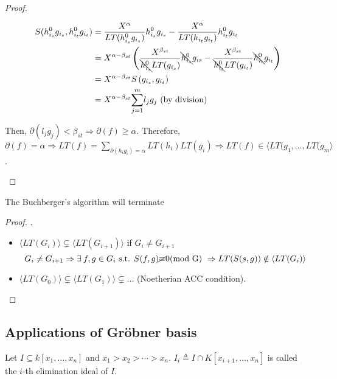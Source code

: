 \begin{theorem}
\begin{proof}
\begin{description} [leftmargin=0cm,labelindent=0cm]
\begin{equation}
\begin{split}
              S(h_{i_s}^0g_{i_s}, h_{i_t}^0g_{i_t}) &= \frac{X^\alpha}{LT(h_{i_s}^0g_{i_s})}h_{i_s}^0g_{i_s} - \frac{X^\alpha}{LT(h_{i_t}g_{i_t})}h_{i_t}^0g_{i_t} \\
              &= X^{\alpha-\beta_{st}} \left( \frac{X^{\beta_{st}}}{\bcancel{h_{i_s}^0}LT(g_{i_s})}\bcancel{h_{i_s}^0}g_{is} - \frac{X^{\beta_{st}}}{\bcancel{h_{i_t}^0}LT(g_{i_t})}\bcancel{h_{i_t}^0}g_{i_t}  \right) \\
              &= X^{\alpha-\beta_{st}} S\left(g_{i_s},g_{i_t}\right) \\
              &= X^{\alpha-\beta_{st}}\overset{m}{\underset{j = 1}{\sum}}{l_jg_j} \text{ (by division)}
            \end{split}
          \end{equation}
      \item Then, $\partial(l_jg_j) < \beta_{st} \Rightarrow \partial(f) \geq \alpha$. Therefore, $\partial(f) = \alpha \Rightarrow LT(f) = \underset{\partial(h_ig_i) = \alpha}{\sum}LT(h_i)LT(g_i) \Rightarrow LT(f) \in \langle LT(g_1,\dots, LT(g_m \rangle$.
 
    \end{description}
  \end{proof}
\end{theorem}

\begin{theorem}
  The Buchberger's algorithm will terminate
  \begin{proof}
    $.$
    \begin{itemize}
      \item $\langle LT(G_i) \rangle \subsetneq \langle LT(G_{i+1}) \rangle$ if $G_i \neq G_{i+1}$
        \[
          G_i \neq G_{i+1} \Rightarrow \exists f, g \in G_i \text{ s.t. } S(f,g) \cancel{\equiv} 0 \text{(mod G) } \Rightarrow LT(S(s,g)) \notin \langle LT(G_i) \rangle
        \]
      \item $\langle LT(G_0) \rangle \subsetneq \langle LT(G_1) \rangle \subsetneq \dots$ (Noetherian ACC condition).
    \end{itemize}
  \end{proof}
\end{theorem}

\subsection{Applications of Gr\"{o}bner basis}
\begin{definition}
  Let $I \subseteq k[x_1, \dots, x_n]$ and $x_1 > x_2 > \dotsm > x_n$.
  $I_i \triangleq I \cap K[x_{i+1}, \dots, x_n]$ is called the $i$-th elimination ideal of $I$.
\end{definition}

